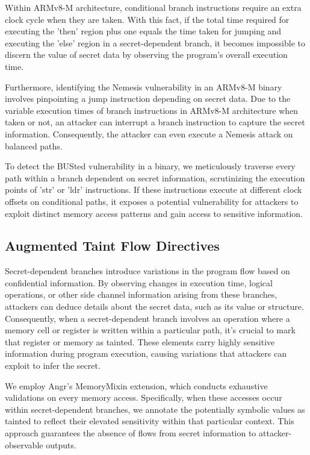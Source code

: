 Within ARMv8-M architecture, conditional branch instructions require an extra clock cycle when they are taken. With this fact, if the total time required for executing the 'then' region plus one equals the time taken for jumping and executing the 'else' region in a secret-dependent branch, it becomes impossible to discern the value of secret data by observing the program's overall execution time.

Furthermore, identifying the Nemesis vulnerability in an ARMv8-M binary involves pinpointing a jump instruction depending on secret data. Due to the variable execution times of branch instructions in ARMv8-M architecture when taken or not, an attacker can interrupt a branch instruction to capture the secret information. Consequently, the attacker can even execute a Nemesis attack on balanced paths.

To detect the BUSted vulnerability in a binary, we meticulously traverse every path within a branch dependent on secret information, scrutinizing the execution points of 'str' or 'ldr' instructions. If these instructions execute at different clock offsets on conditional paths, it exposes a potential vulnerability for attackers to exploit distinct memory access patterns and gain access to sensitive information.

\subsection{Augmented Taint Flow Directives}

Secret-dependent branches introduce variations in the program flow based on confidential information. By observing changes in execution time, logical operations, or other side channel information arising from these branches, attackers can deduce details about the secret data, such as its value or structure. Consequently, when a secret-dependent branch involves an operation where a memory cell or register is written within a particular path, it's crucial to mark that register or memory as tainted. These elements carry highly sensitive information during program execution, causing variations that attackers can exploit to infer the secret.

We employ Angr’s MemoryMixin extension, which conducts exhaustive validations on every memory access. Specifically, when these accesses occur within secret-dependent branches, we annotate the potentially symbolic values as tainted to reflect their elevated sensitivity within that particular context. This approach guarantees the absence of flows from secret information to attacker-observable outputs.
